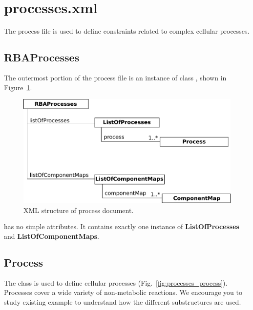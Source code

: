 
\section{processes.xml}

The process file is used to define constraints related to complex
cellular processes.

\subsection{RBAProcesses}
\label{sec:rba_processes}

The outermost portion of the process file is an instance of class
\rbaprocesses, shown in Figure~\ref{fig:processes_doc}.

\begin{figure}
  \centering
  \includegraphics[scale=0.9]{figures/processes_doc}
  \caption{XML structure of process document.}
\label{fig:processes_doc}
\end{figure}

\rbamacromolecules{} has no simple attributes.
It contains exactly one instance of \textbf{ListOfProcesses}
and \textbf{ListOfComponentMaps}.


\subsection{Process}
\label{sec:process}

The \process{} class is used to define cellular processes
(Fig.~\ref{fig:processes_process}).
Processes cover a wide variety of non-metabolic reactions.
We encourage you to study existing example to understand how the different
substructures are used.

